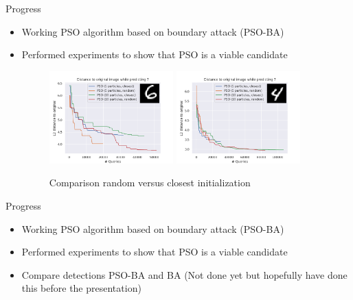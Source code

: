 \documentclass[11pt,t]{beamer}
\begin{document}
\begin{frame}[plain]{Progress}
\begin{itemize}
	\item Working PSO algorithm based on boundary attack (PSO-BA)
	\item Performed experiments to show that PSO is a viable candidate
	\begin{figure}
	\centering
	\includegraphics[width=0.45\textwidth]{graphics/random_vs_closest.png}
	\includegraphics[width=0.45\textwidth]{graphics/random_vs_closest_1.png}
	\caption{Comparison random versus closest initialization\label{fig:rand_vs_close}}
	\footnotesize
	\flushleft
	\end{figure}
\end{itemize}
\end{frame}

\begin{frame}{Progress}
\begin{itemize}
	\item Working PSO algorithm based on boundary attack (PSO-BA)
	\item Performed experiments to show that PSO is a viable candidate
	\item Compare detections PSO-BA and BA (Not done yet but hopefully have done this before the presentation)
\end{itemize}
\end{frame}
\end{document}
